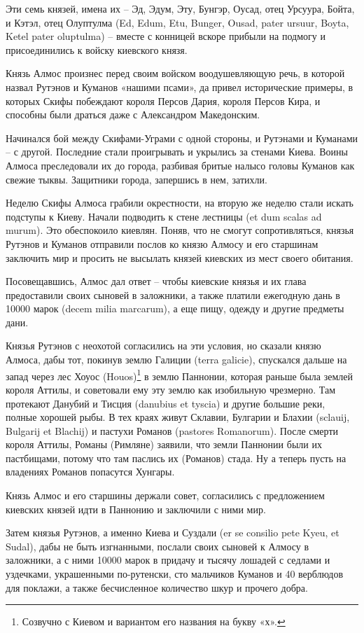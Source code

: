 \documentclass[a5paper,11pt,openany]{article}
\begin{document}
Эти семь князей, имена их – Эд, Эдум, Эту, Бунгэр, Оусад, отец Урсуура, Бойта, и Кэтэл, отец Олуптулма (Ed, Edum, Etu, Bunger, Ousad, pater ursuur, Boyta, Ketel pater oluptulma) – вместе с конницей вскоре прибыли на подмогу и присоединились к войску киевского князя.

Князь Алмос произнес перед своим войском воодушевляющую речь, в которой назвал Рутэнов и Куманов «нашими псами», да привел исторические примеры, в которых Скифы побеждают короля Персов Дария, короля Персов Кира, и способны были драться даже с Александром Македонским.

Начинался бой между Скифами-Уграми с одной стороны, и Рутэнами и Куманами – с другой. Последние стали проигрывать и укрылись за стенами Киева. Воины Алмоса преследовали их до города, разбивая бритые налысо головы Куманов как свежие тыквы. Защитники города, запершись в нем, затихли.

Неделю Скифы Алмоса грабили окрестности, на вторую же неделю стали искать подступы к Киеву. Начали подводить к стене лестницы (et dum scalas ad murum). Это обеспокоило киевлян. Поняв, что не смогут сопротивляться, князья Рутэнов и Куманов отправили послов ко князю Алмосу и его старшинам заключить мир и просить не высылать князей киевских из мест своего обитания. 

Посовещавшись, Алмос дал ответ – чтобы киевские князья и их глава предоставили своих сыновей в заложники, а также платили ежегодную дань в 10000 марок (decem milia marcarum), а еще пищу, одежду и другие предметы дани.

Князья Рутэнов с неохотой согласились на эти условия, но сказали князю Алмоса, дабы тот, покинув землю Галиции (terra galicie), спускался дальше на запад через лес Хоуос (Houos)\footnote{Созвучно с Киевом и вариантом его названия на букву «х».} в землю Паннонии, которая раньше была землей короля Аттилы, и советовали ему эту землю как изобильную чрезмерно. Там протекают Данубий и Тисция (danubius et tyscia) и другие большие реки, полные хорошей рыбы. В тех краях живут Склавии, Булгарии и Блахии (sclauij, Bulgarij et Blachij) и пастухи Романов (pastores Romanorum). После смерти короля Аттилы, Романы (Римляне) заявили, что земли Паннонии были их пастбищами, потому что там паслись их (Романов) стада. Ну а теперь пусть на владениях Романов попасутся Хунгары. 

Князь Алмос и его старшины держали совет,  согласились с предложением киевских князей идти в Паннонию и заключили с ними мир.

Затем князья Рутэнов, а именно Киева и Суздали (er se consilio pete Kyeu, et Sudal), дабы не быть изгнанными, послали своих сыновей к Алмосу в заложники, а с ними 10000 марок в придачу и тысячу лошадей с седлами и уздечками, украшенными по-рутенски, сто мальчиков Куманов и 40 верблюдов для поклажи, а также бесчисленное количество шкур и прочего добра.
\end{document}
